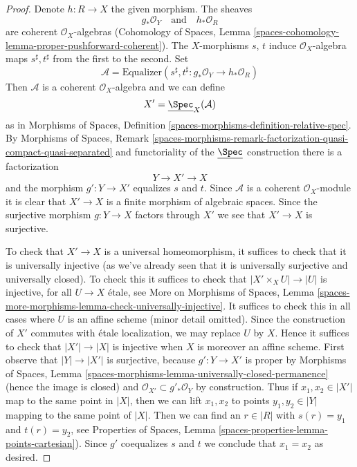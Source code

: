 \begin{proof}
Denote $h : R \to X$ the given morphism. The sheaves
$$
g_*\mathcal{O}_Y
\quad\text{and}\quad
h_*\mathcal{O}_R
$$
are coherent $\mathcal{O}_X$-algebras
(Cohomology of Spaces, Lemma
\ref{spaces-cohomology-lemma-proper-pushforward-coherent}).
The $X$-morphisms $s$, $t$ induce $\mathcal{O}_X$-algebra maps
$s^\sharp, t^\sharp$ from the first to the second.
Set
$$
\mathcal{A} = \text{Equalizer}\left(s^\sharp, t^\sharp :
g_*\mathcal{O}_Y \longrightarrow h_*\mathcal{O}_R\right)
$$
Then $\mathcal{A}$ is a coherent $\mathcal{O}_X$-algebra and we
can define
$$
X' = \underline{\Spec}_X(\mathcal{A})
$$
as in Morphisms of Spaces, Definition
\ref{spaces-morphisms-definition-relative-spec}.
By Morphisms of Spaces, Remark
\ref{spaces-morphisms-remark-factorization-quasi-compact-quasi-separated}
and functoriality of the $\underline{\Spec}$ construction
there is a factorization
$$
Y \longrightarrow X' \longrightarrow X
$$
and the morphism $g' : Y \to X'$ equalizes $s$ and $t$.
Since $\mathcal{A}$ is a coherent $\mathcal{O}_X$-module it is clear that
$X' \to X$ is a finite morphism of algebraic spaces. Since the
surjective morphism $g : Y \to X$ factors through $X'$ we see that
$X' \to X$ is surjective.

\medskip\noindent
To check that $X' \to X$ is a universal homeomorphism, it suffices
to check that it is universally injective (as we've already seen that
it is universally surjective and universally closed). To check this it
suffices to check that $|X' \times_X U| \to |U|$ is injective, for all
$U \to X$ \'etale, see
More on Morphisms of Spaces, Lemma
\ref{spaces-more-morphisms-lemma-check-universally-injective}.
It suffices to check this in all cases where $U$ is an affine scheme
(minor detail omitted). Since the construction of $X'$
commutes with \'etale localization, we may replace $U$ by $X$.
Hence it suffices to check that $|X'| \to |X|$ is injective
when $X$ is moreover an affine scheme. First observe that
$|Y| \to |X'|$ is surjective, because $g' : Y \to X'$ is proper
by Morphisms of Spaces, Lemma
\ref{spaces-morphisms-lemma-universally-closed-permanence}
(hence the image is closed) and
$\mathcal{O}_{X'} \subset g'_*\mathcal{O}_Y$ by construction.
Thus if $x_1, x_2 \in |X'|$ map to the same point in $|X|$, then
we can lift $x_1, x_2$ to points $y_1, y_2 \in |Y|$ mapping to the
same point of $|X|$. Then we can find an $r \in |R|$ with
$s(r) = y_1$ and $t(r) = y_2$, see
Properties of Spaces, Lemma \ref{spaces-properties-lemma-points-cartesian}).
Since $g'$ coequalizes $s$ and $t$ we conclude that $x_1 = x_2$ as desired.


\end{proof}
